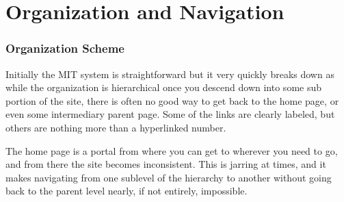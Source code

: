 \section*{Organization and Navigation}
\subsubsection*{Organization Scheme}

Initially the MIT system is straightforward but it very quickly breaks down as while
the organization is hierarchical once you descend down into some sub portion of
the site, there is often no good way to get back to the home page, or even some
intermediary parent page. Some of the links are clearly labeled, but others are
nothing more than a hyperlinked number.

The home page is a portal from where you can get to wherever you need to go, and
from there the site becomes inconsistent. This is jarring at times, and it makes
navigating from one sublevel of the hierarchy to another without going back to the
parent level nearly, if not entirely, impossible.

